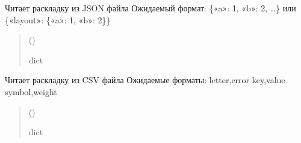 \documentclass[a4paper,11pt,russian,openany,oneside]{sphinxmanual}
\begin{document}

\begin{savenotes}\begin{fulllineitems}
\label{\detokenize{_autosummary/scan_module.read_layout:scan_module.read_layout._read_json_layout}}
\pysigstartsignatures
\pysiglinewithargsret
{}
{}
{}
\pysigstopsignatures
\sphinxAtStartPar
Читает раскладку из JSON файла
Ожидаемый формат: \{«a»: 1, «b»: 2, …\} или \{«layout»: \{«a»: 1, «b»: 2\}\}
\begin{quote}\begin{description}
\sphinxAtStartPar
{} ()

\sphinxAtStartPar
dict

\end{description}\end{quote}

\end{fulllineitems}\end{savenotes}


\begin{savenotes}\begin{fulllineitems}
\label{\detokenize{_autosummary/scan_module.read_layout:scan_module.read_layout._read_csv_layout}}
\pysigstartsignatures
\pysiglinewithargsret
{}
{}
{}
\pysigstopsignatures
\sphinxAtStartPar
Читает раскладку из CSV файла
Ожидаемые форматы:
\sphinxhyphen{} letter,error
\sphinxhyphen{} key,value
\sphinxhyphen{} symbol,weight
\begin{quote}\begin{description}
\sphinxAtStartPar
{} ()

\sphinxAtStartPar
dict

\end{description}\end{quote}

\end{fulllineitems}\end{savenotes}
\end{document}

